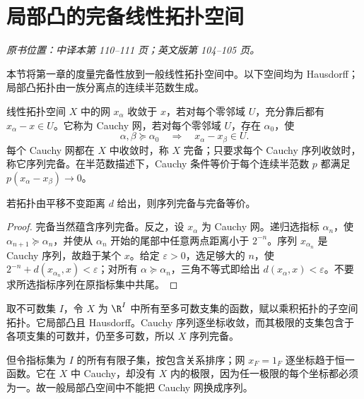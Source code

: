 \section{局部凸的完备线性拓扑空间}\label{sec:yosida-04-03}
\noindent\textit{原书位置：中译本第 110--111 页；英文版第 104--105 页。}

本节将第一章的度量完备性放到一般线性拓扑空间中。以下空间均为 Hausdorff；局部凸拓扑由一族分离点的连续半范数生成。

\begin{definition}\label{def:y4-completeness}
线性拓扑空间 $X$ 中的网 $x_\alpha$ 收敛于 $x$，若对每个零邻域 $U$，充分靠后都有 $x_\alpha-x\in U$。它称为 Cauchy 网，若对每个零邻域 $U$，存在 $\alpha_0$，使
\[
 \alpha,\beta\succeq\alpha_0\quad\Longrightarrow\quad x_\alpha-x_\beta\in U.
\]
每个 Cauchy 网都在 $X$ 中收敛时，称 $X$ 完备；只要求每个 Cauchy 序列收敛时，称它序列完备。在半范数描述下，Cauchy 条件等价于每个连续半范数 $p$ 都满足 $p(x_\alpha-x_\beta)\to0$。
\end{definition}

\begin{proposition}[可度量情形的两种完备性]\label{prop:y4-metric-completeness}
若拓扑由平移不变距离 $d$ 给出，则序列完备与完备等价。
\end{proposition}
\begin{proof}
完备当然蕴含序列完备。反之，设 $x_\alpha$ 为 Cauchy 网。递归选指标 $\alpha_n$，使 $\alpha_{n+1}\succeq\alpha_n$，并使从 $\alpha_n$ 开始的尾部中任意两点距离小于 $2^{-n}$。序列 $x_{\alpha_n}$ 是 Cauchy 序列，故趋于某个 $x$。给定 $\varepsilon>0$，选足够大的 $n$，使 $2^{-n}+d(x_{\alpha_n},x)<\varepsilon$；对所有 $\alpha\succeq\alpha_n$，三角不等式即给出 $d(x_\alpha,x)<\varepsilon$。不要求所选指标序列在原指标集中共尾。
\end{proof}

\begin{example}[序列完备却不完备]
取不可数集 $I$，令 $X$ 为 $\R^I$ 中所有至多可数支集的函数，赋以乘积拓扑的子空间拓扑。它局部凸且 Hausdorff。Cauchy 序列逐坐标收敛，而其极限的支集包含于各项支集的可数并，仍至多可数，所以 $X$ 序列完备。

但令指标集为 $I$ 的所有有限子集，按包含关系排序；网 $x_F=1_F$ 逐坐标趋于恒一函数。它在 $X$ 中 Cauchy，却没有 $X$ 内的极限，因为任一极限的每个坐标都必须为一。故一般局部凸空间中不能把 Cauchy 网换成序列。
\end{example}

